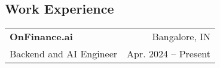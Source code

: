 \documentclass[margin, 11pt]{res}
\makeatletter
\newcommand{\li}{https://linkedin.com/in/harishvadaparty}
\newcommand{\gh}{https://github.com/Harryalways317}
\newcommand{\personalsite}{https://hvadaparty.vercel.app}
\newcommand{\resumeSubheading}[4]{

\begin{tabular*}{1.01\textwidth}{@{\hspace{-4pt}}l @{\extracolsep{\fill}} r}
\textbf{#1} & #2 \\
      {#3} &  {#4}
\end{tabular*}\vspace{-2pt}
}
\makeatother
\begin{document}
\address{
    \href{https://hvadaparty.vercel.app}{Portfolio} $|$
    \href{mailto:harishvadapartygmail.com}{harishvadaparty@gmail.com} $|$ 
    \href{\li}{linkedin.com/in/harishvadaparty} $|$
    \href{\gh}{github.com/Harryalways317}
}

\begin{resume}

\section{\sc Work Experience}

\vspace{2pt}

\resumeSubheading{{\bf OnFinance.ai}}{Bangalore, IN}
{Backend and AI Engineer}{Apr. 2024 -- Present}


\end{resume}
\end{document}
